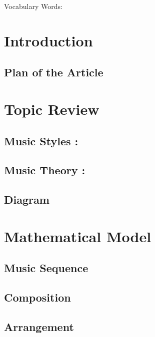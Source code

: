 
Vocabulary Words:

\section{Introduction}

\subsection{Plan of the Article}

\section{Topic Review}

\subsection{Music Styles :}

\subsection{Music Theory :}

\subsection{Diagram}

\section{Mathematical Model}

\subsection{Music Sequence}

\subsection{Composition}

\subsection{Arrangement} 


